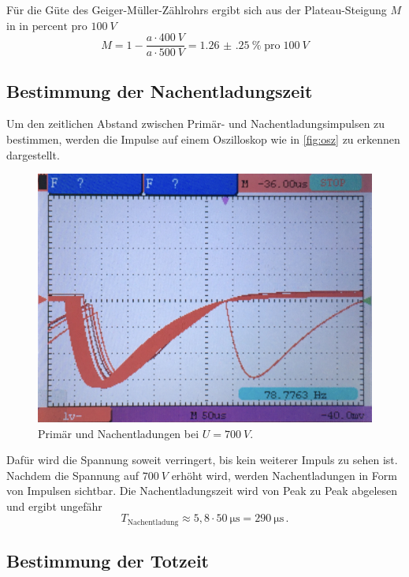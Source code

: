 Für die Güte des Geiger-Müller-Zählrohrs ergibt sich aus der Plateau-Steigung $M$ in in
$\mathrm{percent}$ pro $\qty{100}{V}$
\begin{equation*}
    M = 1 - \frac{a \cdot \qty{400}{V}}{a \cdot \qty{500}{V}} 
    = \qty{1.26(25)}{\percent} \; \text{pro} \; \qty{100}{V} 
\end{equation*}


\subsection{Bestimmung der Nachentladungszeit}

Um den zeitlichen Abstand zwischen Primär- und Nachentladungsimpulsen zu bestimmen,
werden die Impulse auf einem Oszilloskop wie in \autoref{fig:osz} zu erkennen dargestellt.
\begin{figure}
    \centering
    \includegraphics[width = 0.8\linewidth]{pictures/osz.jpg}
    \caption{Primär und Nachentladungen bei $U = \qty{700}{V}$.}
    \label{fig:osz}
\end{figure}

Dafür wird die Spannung soweit verringert, bis kein weiterer Impuls zu sehen ist.
Nachdem die Spannung auf $\qty{700}{V}$ erhöht wird, werden Nachentladungen in Form von Impulsen sichtbar.
Die Nachentladungszeit wird von Peak zu Peak abgelesen und ergibt ungefähr
\begin{equation*}
    T_\text{Nachentladung} \approx 5,8 \cdot \qty{50}{\micro\second} = \qty{290}{\micro\second} \, .
\end{equation*}


\subsection{Bestimmung der Totzeit}

